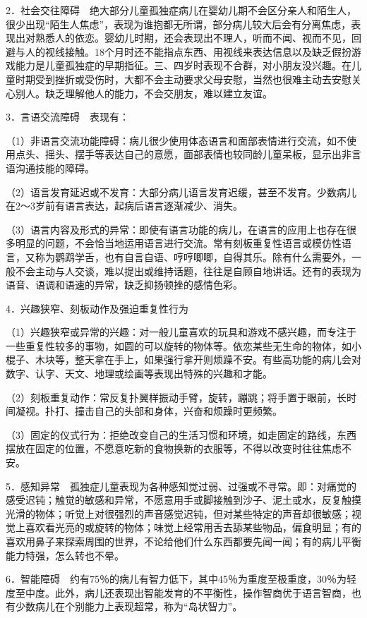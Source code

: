 2．社会交往障碍　绝大部分儿童孤独症病儿在婴幼儿期不会区分亲人和陌生人，很少出现“陌生人焦虑”，表现为谁抱都无所谓，部分病儿较大后会有分离焦虑，表现出对熟悉人的依恋。婴幼儿时期，还会表现出不理人，听而不闻、视而不见，回避与人的视线接触。18个月时还不能指点东西、用视线来表达信息以及缺乏假扮游戏能力是儿童孤独症的早期指征。三、四岁时表现不合群，对小朋友没兴趣。在儿童时期受到挫折或受伤时，大都不会主动要求父母安慰，当然也很难主动去安慰关心别人。缺乏理解他人的能力，不会交朋友，难以建立友谊。

3．言语交流障碍　表现有：

（1）非语言交流功能障碍：病儿很少使用体态语言和面部表情进行交流，如不使用点头、摇头、摆手等表达自己的意愿，面部表情也较同龄儿童呆板，显示出非言语沟通技能的障碍。

（2）语言发育延迟或不发育：大部分病儿语言发育迟缓，甚至不发育。少数病儿在2～3岁前有语言表达，起病后语言逐渐减少、消失。

（3）语言内容及形式的异常：即使有语言功能的病儿，在语言的应用上也存在很多明显的问题，不会恰当地运用语言进行交流。常有刻板重复性语言或模仿性语言，又称为鹦鹉学舌，也有自言自语、哼哼唧唧，自得其乐。除有什么需要外，一般不会主动与人交谈，难以提出或维持话题，往往是自顾自地讲话。还有的表现为语音、语调和语速的异常，缺乏抑扬顿挫的感情色彩。

4．兴趣狭窄、刻板动作及强迫重复性行为

（1）兴趣狭窄或异常的兴趣：对一般儿童喜欢的玩具和游戏不感兴趣，而专注于一些重复性较多的事物，如圆的可以旋转的物体等。依恋某些无生命的物体，如小棍子、木块等，整天拿在手上，如果强行拿开则烦躁不安。有些高功能的病儿会对数字、认字、天文、地理或绘画等表现出特殊的兴趣和才能。

（2）刻板重复动作：常反复扑翼样振动手臂，旋转，蹦跳；将手置于眼前，长时间凝视。扑打、撞击自己的头部和身体，兴奋和烦躁时更频繁。

（3）固定的仪式行为：拒绝改变自己的生活习惯和环境，如走固定的路线，东西摆放在固定的位置，不愿意吃新的食物换新的衣服等，不得以改变时往往焦虑不安。

5．感知异常　孤独症儿童表现为各种感知觉过弱、过强或不寻常。即：对痛觉的感受迟钝；触觉的敏感和异常，不愿意用手或脚接触到沙子、泥土或水，反复触摸光滑的物体；听觉上对很强烈的声音感觉迟钝，但对某些特定的声音却很敏感；视觉上喜欢看光亮的或旋转的物体；味觉上经常用舌去舔某些物品，偏食明显；有的喜欢用鼻子来探索周围的世界，不论给他们什么东西都要先闻一闻；有的病儿平衡能力特强，怎么转也不晕。

6．智能障碍　约有75％的病儿有智力低下，其中45％为重度至极重度，30％为轻度至中度。此外，病儿还表现出智能发育的不平衡性，操作智商优于语言智商，也有少数病儿在个别能力上表现超常，称为“岛状智力”。

